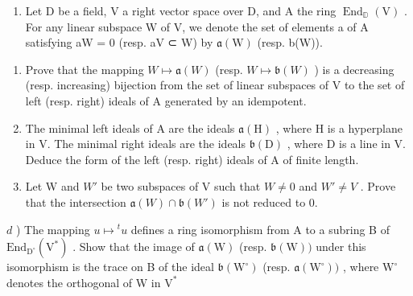 
\begin{enumerate}
\def\labelenumi{\arabic{enumi})}
\tightlist
\item
  Let D be a field, V a right vector space over D, and A the ring \(\operatorname{End}_{\mathbb{D}}(\mathrm{V})\) . For any linear subspace W of V, we denote the set of elements a of A satisfying aW = 0 (resp. aV ⊂ W) by \(\mathfrak{a}(\mathrm{W})\) (resp. b(W)).
\end{enumerate}

\begin{enumerate}
\def\labelenumi{\alph{enumi})}
\item
  Prove that the mapping \(W \mapsto \mathfrak{a}(W)\) (resp. \(W \mapsto \mathfrak{b}(W)\) ) is a decreasing (resp. increasing) bijection from the set of linear subspaces of V to the set of left (resp. right) ideals of A generated by an idempotent.
\item
  The minimal left ideals of A are the ideals \(\mathfrak{a}(\mathrm{H})\) , where H is a hyperplane in V. The minimal right ideals are the ideals \(\mathfrak{b}(\mathrm{D})\) , where D is a line in V. Deduce the form of the left (resp. right) ideals of A of finite length.
\item
  Let W and \(W'\) be two subspaces of V such that \(W \neq 0\) and \(W' \neq V\) . Prove that the intersection \(\mathfrak{a}(W) \cap \mathfrak{b}(W')\) is not reduced to 0.
\end{enumerate}

\(d\) ) The mapping \(u\mapsto{}^{t}u\) defines a ring isomorphism from A to a subring B of \(\mathrm{End}_{\mathrm{D}^{\circ}}(\mathrm{V}^{*})\) . Show that the image of \(\mathfrak{a}(\mathrm{W})\) (resp. \(\mathfrak{b}(\mathrm{W}))\) under this isomorphism is the trace on B of the ideal \(\mathfrak{b}(\mathrm{W}^{\circ})\) (resp. \(\mathfrak{a}(\mathrm{W}^{\circ}))\) , where \(\mathrm{W}^{\circ}\) denotes the orthogonal of W in \(\mathrm{V}^*\)

